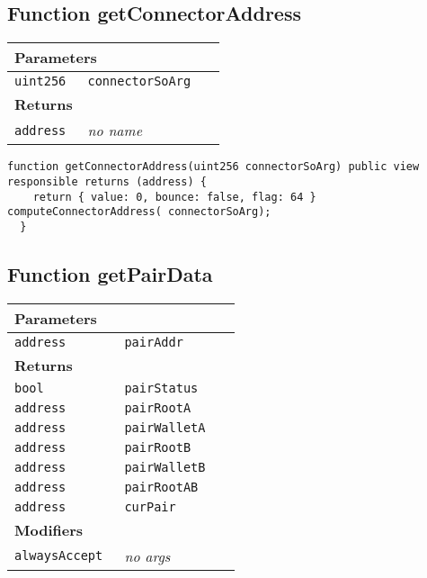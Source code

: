 \subsection{Function getConnectorAddress}


\ifsoltables
\noindent\begin{tabular}{|l|l|p{5cm}|}\hline
\multicolumn{3}{|l|}{\bf Parameters}\\\hline
\tt uint256 & \tt connectorSoArg &\\\hline
\multicolumn{3}{|l|}{\bf Returns}\\\hline
\tt address & {\em no name} &\\\hline
\end{tabular}
\fi

\vspace{2cm}

\begin{lstlisting}[firstnumber=153]
  function getConnectorAddress(uint256 connectorSoArg) public view responsible returns (address) {
    return { value: 0, bounce: false, flag: 64 } computeConnectorAddress( connectorSoArg);
  }
\end{lstlisting}

\subsection{Function getPairData}


\ifsoltables
\noindent\begin{tabular}{|l|l|p{5cm}|}\hline
\multicolumn{3}{|l|}{\bf Parameters}\\\hline
\tt address & \tt pairAddr &\\\hline
\multicolumn{3}{|l|}{\bf Returns}\\\hline
\tt bool & \tt pairStatus &\\\hline
\tt address & \tt pairRootA &\\\hline
\tt address & \tt pairWalletA &\\\hline
\tt address & \tt pairRootB &\\\hline
\tt address & \tt pairWalletB &\\\hline
\tt address & \tt pairRootAB &\\\hline
\tt address & \tt curPair &\\\hline
\multicolumn{3}{|l|}{\bf Modifiers}\\\hline
\tt alwaysAccept & {\em no args} &\\\hline
\end{tabular}
\fi

